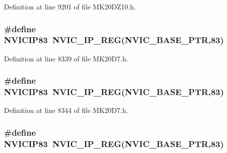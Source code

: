 Definition at line 9201 of file M\+K20\+D\+Z10.\+h.

\subsubsection[{\texorpdfstring{N\+V\+I\+C\+I\+P83}{NVICIP83}}]{\setlength{\rightskip}{0pt plus 5cm}\#define N\+V\+I\+C\+I\+P83~{\bf N\+V\+I\+C\+\_\+\+I\+P\+\_\+\+R\+EG}({\bf N\+V\+I\+C\+\_\+\+B\+A\+S\+E\+\_\+\+P\+TR},83)}\hypertarget{group___n_v_i_c___register___accessor___macros_ga3afe7f0f0d7665de9f29b897fe79563f}{}\label{group___n_v_i_c___register___accessor___macros_ga3afe7f0f0d7665de9f29b897fe79563f}


Definition at line 8339 of file M\+K20\+D7.\+h.

\subsubsection[{\texorpdfstring{N\+V\+I\+C\+I\+P83}{NVICIP83}}]{\setlength{\rightskip}{0pt plus 5cm}\#define N\+V\+I\+C\+I\+P83~{\bf N\+V\+I\+C\+\_\+\+I\+P\+\_\+\+R\+EG}({\bf N\+V\+I\+C\+\_\+\+B\+A\+S\+E\+\_\+\+P\+TR},83)}\hypertarget{group___n_v_i_c___register___accessor___macros_ga3afe7f0f0d7665de9f29b897fe79563f}{}\label{group___n_v_i_c___register___accessor___macros_ga3afe7f0f0d7665de9f29b897fe79563f}


Definition at line 8344 of file M\+K20\+D7.\+h.

\subsubsection[{\texorpdfstring{N\+V\+I\+C\+I\+P83}{NVICIP83}}]{\setlength{\rightskip}{0pt plus 5cm}\#define N\+V\+I\+C\+I\+P83~{\bf N\+V\+I\+C\+\_\+\+I\+P\+\_\+\+R\+EG}({\bf N\+V\+I\+C\+\_\+\+B\+A\+S\+E\+\_\+\+P\+TR},83)}\hypertarget{group___n_v_i_c___register___accessor___macros_ga3afe7f0f0d7665de9f29b897fe79563f}{}\label{group___n_v_i_c___register___accessor___macros_ga3afe7f0f0d7665de9f29b897fe79563f}


